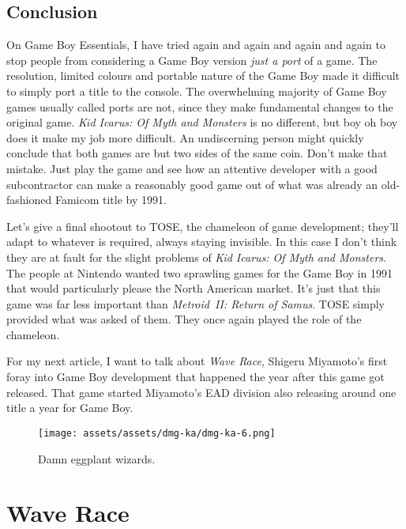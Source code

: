 \documentclass{book}
\begin{document}
\FloatBarrier\needspace{10mm}\section*{Conclusion}\nopagebreak[4]

On Game Boy Essentials, I have tried again and again and again and again to stop people from considering a Game Boy version \emph{just a port} of a game. The resolution, limited colours and portable nature of the Game Boy made it difficult to simply port a title to the console. The overwhelming majority of Game Boy games usually called ports are not, since they make fundamental changes to the original game. \emph{Kid Icarus: Of Myth and Monsters} is no different, but boy oh boy does it make my job more difficult. An undiscerning person might quickly conclude that both games are but two sides of the same coin. Don’t make that mistake. Just play the game and see how an attentive developer with a good subcontractor can make a reasonably good game out of what was already an old-fashioned Famicom title by 1991.

Let’s give a final shootout to TOSE, the chameleon of game development; they’ll adapt to whatever is required, always staying invisible. In this case I don’t think they are at fault for the slight problems of \emph{Kid Icarus: Of Myth and Monsters}. The people at Nintendo wanted two sprawling games for the Game Boy in 1991 that would particularly please the North American market. It’s just that this game was far less important than \emph{Metroid II: Return of Samus}. TOSE simply provided what was asked of them. They once again played the role of the chameleon.

For my next article, I want to talk about \emph{Wave Race}, Shigeru Miyamoto’s first foray into Game Boy development that happened the year after this game got released. That game started Miyamoto’s EAD division also releasing around one title a year for Game Boy.

\begin{figure}[hbt]
\vskip 10pt
\centering \texttt{[image: assets/assets/dmg-ka/dmg-ka-6.png]}\par\pagetwodescription Damn eggplant wizards.
\vskip 6pt
\end{figure}


\begingroup \chapter*{Wave Race} \endgroup
\end{document}
